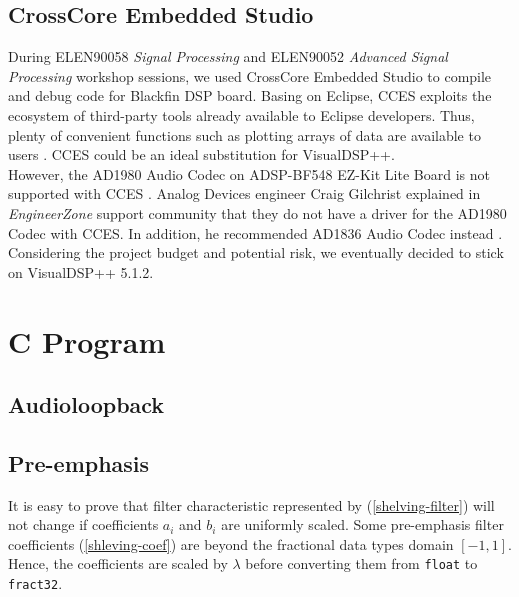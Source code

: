 
\subsection{CrossCore Embedded Studio}

During ELEN90058 \textit{Signal Processing} and ELEN90052 \textit{Advanced Signal Processing} workshop sessions, we used CrossCore\textsuperscript{\textregistered} Embedded Studio to compile and debug code for Blackfin DSP board. Basing on Eclipse, CCES exploits the ecosystem of third-party tools already available to Eclipse developers. Thus, plenty of convenient functions such as plotting arrays of data are available to users \cite{erik-cces}\cite{cces-faq}. CCES could be an ideal substitution for VisualDSP++.\\

However, the AD1980 Audio Codec on ADSP-BF548 EZ-Kit Lite Board is not supported with CCES \cite{cces-ad1980}. Analog Devices engineer Craig Gilchrist explained in \textit{EngineerZone} support community that they do not have a driver for the AD1980 Codec with CCES. In addition, he recommended AD1836 Audio Codec instead \cite{BF548-BSP}.\\

Considering the project budget and potential risk, we eventually decided to stick on VisualDSP++ 5.1.2.


\section{C Program}

\subsection{Audioloopback}


\subsection{Pre-emphasis}

It is easy to prove that filter characteristic represented by (\ref{shelving-filter}) will not change if coefficients $a_i$ and $b_i$ are uniformly scaled. Some pre-emphasis filter coefficients (\ref{shleving-coef}) are beyond the fractional data types domain $[-1, 1]$. Hence, the coefficients are scaled by $\lambda$ before converting them from \texttt{float} to \texttt{fract32}.\\

